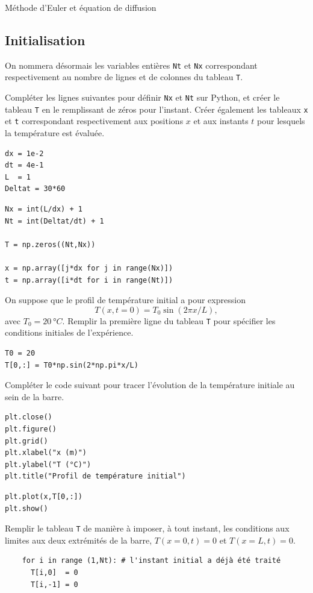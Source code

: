 \begin{exo}[PC][1][devoir]{Méthode d'Euler et équation de diffusion}
\subsection{Initialisation}
\begin{quest}
  \item	

  On nommera désormais les variables entières \texttt{Nt} et \texttt{Nx} correspondant respectivement au nombre de lignes  et de colonnes du tableau \texttt{T}.
  
  Compléter les lignes suivantes pour définir \texttt{Nx} et \texttt{Nt} sur Python, et créer le tableau \texttt{T} en le remplissant de zéros pour l'instant. Créer également les tableaux \texttt{x} et \texttt{t} correspondant respectivement aux positions $x$ et aux instants $t$ pour lesquels la température est évaluée.
  \begin{verbatim}
dx = 1e-2
dt = 4e-1
L  = 1
Deltat = 30*60
  \end{verbatim}
    \begin{verbatim}
Nx = int(L/dx) + 1
Nt = int(Deltat/dt) + 1

T = np.zeros((Nt,Nx))

x = np.array([j*dx for j in range(Nx)])
t = np.array([i*dt for i in range(Nt)])
  \end{verbatim}
\item On suppose que le profil de température initial a pour expression 
$$
T(x,t=0) = T_0 \sin (2\pi x/L),
$$
avec $T_0 = \SI{20}{\degree C}$. Remplir la première ligne du tableau \texttt{T} pour spécifier les conditions initiales de l'expérience.
  \begin{verbatim}
T0 = 20
T[0,:] = T0*np.sin(2*np.pi*x/L)
  \end{verbatim}
\item Compléter le code suivant pour tracer l'évolution de la température initiale au sein de la barre.
\begin{verbatim}
plt.close()
plt.figure()
plt.grid()
plt.xlabel("x (m)")
plt.ylabel("T (°C)")
plt.title("Profil de température initial")
\end{verbatim}
\begin{verbatim}
plt.plot(x,T[0,:])
plt.show()
\end{verbatim}
\end{quest}


\begin{quest}
  \item	
  Remplir le tableau \texttt{T} de manière à imposer, à tout instant, les conditions aux limites aux deux extrémités de la barre, $T(x=0,t)=0$ et $T(x=L,t)=0$.
    \begin{verbatim}
    for i in range (1,Nt): # l'instant initial a déjà été traité
      T[i,0]  = 0
      T[i,-1] = 0
    \end{verbatim}
  \end{quest}
  

\end{exo}
